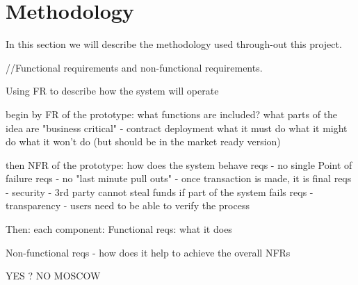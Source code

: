 \section{Methodology}
% 
In this section we will describe the methodology used through-out this project.

//Functional requirements and non-functional requirements.

Using FR to describe how the system will operate
 
begin by FR of the prototype: what functions are included? what parts of the idea are "business critical" - contract deployment
what it must do
what it might do
what it won't do (but should be in the market ready version)

then NFR of the prototype: how does the system behave
reqs - no single Point of failure
reqs - no "last minute pull outs" - once transaction is made, it is final
reqs - security - 3rd party cannot steal funds if part of the system fails
reqs - transparency - users need to be able to verify the process


Then:
each component:
Functional reqs: what it does

Non-functional reqs - how does it help to achieve the overall NFRs





YES ? NO MOSCOW

% 
